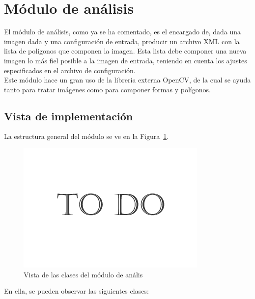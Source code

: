 \section{Módulo de análisis}



El módulo de análisis, como ya se ha comentado, es el encargado de, dada una imagen dada y una configuración de entrada, producir un archivo XML con la lista de polígonos que componen la imagen. Esta lista debe componer una nueva imagen lo más fiel posible a la imagen de entrada, teniendo en cuenta los ajustes especificados en el archivo de configuración.\\

Este módulo hace un gran uso de la librería externa OpenCV, de la cual se ayuda tanto para tratar imágenes como para componer formas y polígonos.

\subsection{Vista de implementación}

La estructura general del módulo se ve en la Figura~\ref{fig:diagramaclasesPHIC}.\\

		\begin{figure}[htbp]
		\centering
		\includegraphics[scale=0.47]{graphics/todo.png}
		\caption{Vista de las clases del módulo de anális}
		\label{fig:diagramaclasesPHIC}
		\end{figure}
		
		
En ella, se pueden observar las siguientes clases:\\

